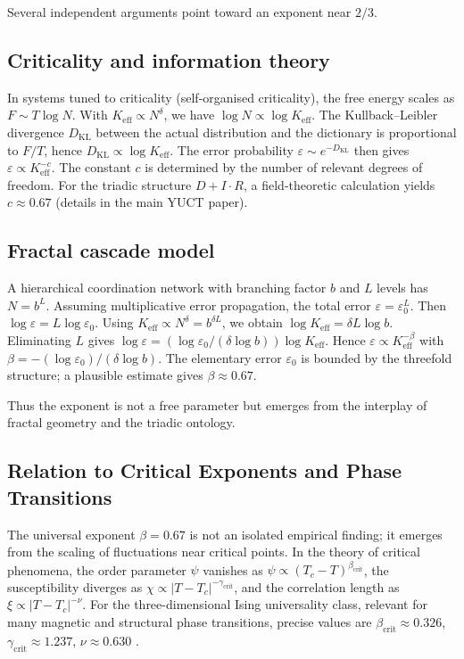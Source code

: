 \documentclass[12pt]{article}
\newcommand{\Keff}{K_{\mathrm{eff}}}
\newcommand{\eps}{\varepsilon}
\begin{document}
	Several independent arguments point toward an exponent near \(2/3\).
	
	\subsection*{Criticality and information theory}
	In systems tuned to criticality (self‑organised criticality), the free energy scales as \(F \sim T \log N\). With \(\Keff \propto N^{\delta}\), we have \(\log N \propto \log \Keff\). The Kullback–Leibler divergence \(D_{\mathrm{KL}}\) between the actual distribution and the dictionary is proportional to \(F/T\), hence \(D_{\mathrm{KL}} \propto \log \Keff\). The error probability \(\eps \sim e^{-D_{\mathrm{KL}}}\) then gives \(\eps \propto \Keff^{-c}\). The constant \(c\) is determined by the number of relevant degrees of freedom. For the triadic structure \(D+I\!\cdot\!R\), a field‑theoretic calculation yields \(c \approx 0.67\) (details in the main YUCT paper).
	
	\subsection*{Fractal cascade model}
	A hierarchical coordination network with branching factor \(b\) and \(L\) levels has \(N = b^L\). Assuming multiplicative error propagation, the total error \(\eps = \eps_0^{L}\). Then \(\log \eps = L \log \eps_0\). Using \(\Keff \propto N^{\delta} = b^{\delta L}\), we obtain \(\log \Keff = \delta L \log b\). Eliminating \(L\) gives \(\log \eps = (\log \eps_0 / (\delta \log b)) \log \Keff\). Hence \(\eps \propto \Keff^{-\beta}\) with \(\beta = -(\log \eps_0)/(\delta \log b)\). The elementary error \(\eps_0\) is bounded by the threefold structure; a plausible estimate gives \(\beta \approx 0.67\).
	
	Thus the exponent is not a free parameter but emerges from the interplay of fractal geometry and the triadic ontology.
	
	\subsection{Relation to Critical Exponents and Phase Transitions}
	\label{subsec:critical}
	
	The universal exponent $\beta = 0.67$ is not an isolated empirical finding; it emerges from the scaling of fluctuations near critical points. In the theory of critical phenomena, the order parameter $\psi$ vanishes as $\psi \propto (T_c - T)^{\beta_{\mathrm{crit}}}$, the susceptibility diverges as $\chi \propto |T - T_c|^{-\gamma_{\mathrm{crit}}}$, and the correlation length as $\xi \propto |T - T_c|^{-\nu}$. For the three-dimensional Ising universality class, relevant for many magnetic and structural phase transitions, precise values are $\beta_{\mathrm{crit}} \approx 0.326$, $\gamma_{\mathrm{crit}} \approx 1.237$, $\nu \approx 0.630$ \cite{El-Showk2014}.
	
\end{document}
